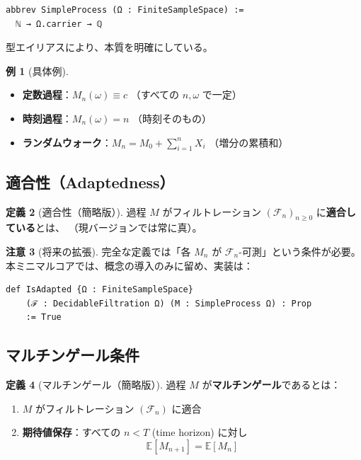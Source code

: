 \documentclass[a4paper,12pt]{ltjsarticle}
\theoremstyle{definition}
\newtheorem{definition}{定義}[section]
\newtheorem{example}[definition]{例}
\newtheorem{remark}[definition]{注意}
\begin{document}
\begin{codebox}
\begin{verbatim}
abbrev SimpleProcess (Ω : FiniteSampleSpace) :=
  ℕ → Ω.carrier → ℚ
\end{verbatim}
型エイリアスにより、本質を明確にしている。
\end{codebox}

\begin{example}[具体例]
\begin{itemize}
  \item \textbf{定数過程}：$M_n(\omega) \equiv c$ （すべての $n, \omega$ で一定）
  \item \textbf{時刻過程}：$M_n(\omega) = n$ （時刻そのもの）
  \item \textbf{ランダムウォーク}：$M_n = M_0 + \sum_{i=1}^n X_i$ （増分の累積和）
\end{itemize}
\end{example}

\subsection{適合性（Adaptedness）}

\begin{definition}[適合性（簡略版）]
過程 $M$ がフィルトレーション $(\mathcal{F}_n)_{n \geq 0}$ に\textbf{適合している}とは、
（現バージョンでは常に真）。
\end{definition}

\begin{remark}[将来の拡張]
完全な定義では「各 $M_n$ が $\mathcal{F}_n$-可測」という条件が必要。
本ミニマルコアでは、概念の導入のみに留め、実装は：
\begin{verbatim}
def IsAdapted {Ω : FiniteSampleSpace}
    (ℱ : DecidableFiltration Ω) (M : SimpleProcess Ω) : Prop
    := True
\end{verbatim}
\end{remark}

\subsection{マルチンゲール条件}

\begin{definition}[マルチンゲール（簡略版）]
過程 $M$ が\textbf{マルチンゲール}であるとは：
\begin{enumerate}
  \item $M$ がフィルトレーション $(\mathcal{F}_n)$ に適合
  \item \textbf{期待値保存}：すべての $n < T$ (time horizon) に対し
  \[
    \mathbb{E}[M_{n+1}] = \mathbb{E}[M_n]
  \]
\end{enumerate}
\end{definition}
\end{document}
